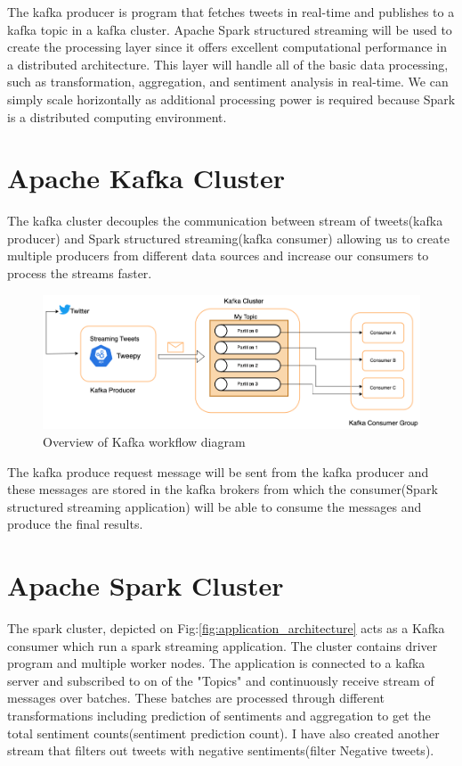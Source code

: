 \documentclass[12pt,a4paper]{report}
\begin{document}
The kafka producer is program that fetches tweets in real-time and publishes to a kafka topic in a kafka cluster. Apache Spark structured streaming will be used to create the processing layer since it offers excellent computational performance in a distributed architecture. This layer will handle all of the basic data processing, such as transformation, aggregation, and sentiment analysis in real-time. We can simply scale horizontally as additional processing power is required because Spark is a distributed computing environment.

\section{Apache Kafka Cluster}
The kafka cluster decouples the communication between stream of tweets(kafka producer) and Spark structured streaming(kafka consumer) allowing us to create multiple producers from different data sources and increase our consumers  to process the streams faster.  
\begin{figure}[h]
\centering
\includegraphics[width=1\textwidth]{images/kafka.png}
\caption{Overview of Kafka workflow diagram}
\label{fig:kafka_architecture}
\end{figure}

The kafka produce request message will be sent from the kafka producer and these messages are stored in the kafka brokers from which the consumer(Spark structured streaming application) will be able to consume the messages and produce the final results.

\section{Apache Spark Cluster}

The spark cluster, depicted on Fig:\ref{fig:application_architecture} acts as a Kafka consumer which run a spark streaming application. The cluster contains driver program and multiple worker nodes. The application is connected to a kafka server and subscribed to on of the "Topics" and continuously receive stream of messages over batches. These batches are processed through different transformations including prediction of sentiments and aggregation to get the total sentiment counts(sentiment prediction count). I have also created another stream that filters out tweets with negative sentiments(filter Negative tweets).  \\
\end{document}
